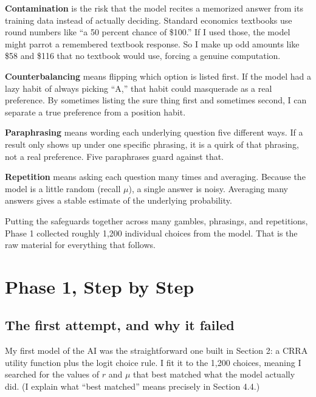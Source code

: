 \documentclass[11pt]{article}
\newcommand{\term}[1]{\textbf{\color{mossdk}#1}}
\begin{document}
\begin{defbox}
\term{Contamination} is the risk that the model recites a memorized answer from its training data
instead of actually deciding. Standard economics textbooks use round numbers like ``a 50 percent
chance of \$100.'' If I used those, the model might parrot a remembered textbook response. So I make up
odd amounts like \$58 and \$116 that no textbook would use, forcing a genuine computation.

\smallskip
\term{Counterbalancing} means flipping which option is listed first. If the model had a lazy habit of
always picking ``A,'' that habit could masquerade as a real preference. By sometimes listing the sure
thing first and sometimes second, I can separate a true preference from a position habit.

\smallskip
\term{Paraphrasing} means wording each underlying question five different ways. If a result only shows
up under one specific phrasing, it is a quirk of that phrasing, not a real preference. Five
paraphrases guard against that.

\smallskip
\term{Repetition} means asking each question many times and averaging. Because the model is a little
random (recall $\mu$), a single answer is noisy. Averaging many answers gives a stable estimate of the
underlying probability.
\end{defbox}

Putting the safeguards together across many gambles, phrasings, and repetitions, Phase 1 collected
roughly 1,200 individual choices from the model. That is the raw material for everything that follows.

\section{Phase 1, Step by Step}

\subsection{The first attempt, and why it failed}

My first model of the AI was the straightforward one built in Section 2: a CRRA utility function plus
the logit choice rule. I fit it to the 1,200 choices, meaning I searched for the values of $r$ and
$\mu$ that best matched what the model actually did. (I explain what ``best matched'' means precisely
in Section 4.4.)
\end{document}
